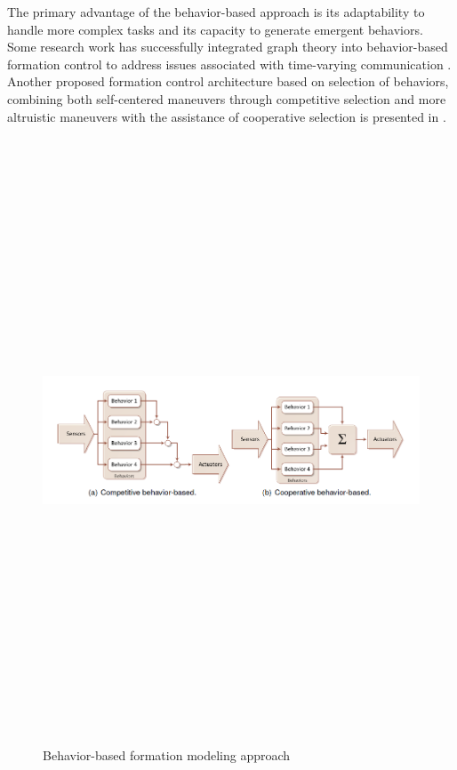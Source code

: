 The primary advantage of the behavior-based approach is its adaptability to handle more complex tasks and its capacity to generate emergent behaviors. Some research work has successfully integrated graph theory into behavior-based formation control to address issues associated with time-varying communication \cite{4522625}. Another proposed formation control architecture based on selection of behaviors, combining both self-centered maneuvers through competitive selection and more altruistic maneuvers with the assistance of cooperative selection is presented in \cite{736776}. 


\begin{figure}[!h]
        \centering 
        \includegraphics[width=14cm,height=18cm,keepaspectratio]{chapters/Chapitre_3/Figures/behavior_based.PNG}
        \caption{Behavior-based formation modeling approach \cite{ventura2015safe}}
        \label{fig:Behavior-based}
        \end{figure}



